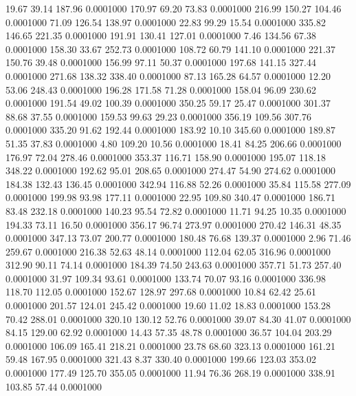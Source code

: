   19.67   39.14  187.96   0.0001000
 170.97   69.20   73.83   0.0001000
 216.99  150.27  104.46   0.0001000
  71.09  126.54  138.97   0.0001000
  22.83   99.29   15.54   0.0001000
 335.82  146.65  221.35   0.0001000
 191.91  130.41  127.01   0.0001000
   7.46  134.56   67.38   0.0001000
 158.30   33.67  252.73   0.0001000
 108.72   60.79  141.10   0.0001000
 221.37  150.76   39.48   0.0001000
 156.99   97.11   50.37   0.0001000
 197.68  141.15  327.44   0.0001000
 271.68  138.32  338.40   0.0001000
  87.13  165.28   64.57   0.0001000
  12.20   53.06  248.43   0.0001000
 196.28  171.58   71.28   0.0001000
 158.04   96.09  230.62   0.0001000
 191.54   49.02  100.39   0.0001000
 350.25   59.17   25.47   0.0001000
 301.37   88.68   37.55   0.0001000
 159.53   99.63   29.23   0.0001000
 356.19  109.56  307.76   0.0001000
 335.20   91.62  192.44   0.0001000
 183.92   10.10  345.60   0.0001000
 189.87   51.35   37.83   0.0001000
   4.80  109.20   10.56   0.0001000
  18.41   84.25  206.66   0.0001000
 176.97   72.04  278.46   0.0001000
 353.37  116.71  158.90   0.0001000
 195.07  118.18  348.22   0.0001000
 192.62   95.01  208.65   0.0001000
 274.47   54.90  274.62   0.0001000
 184.38  132.43  136.45   0.0001000
 342.94  116.88   52.26   0.0001000
  35.84  115.58  277.09   0.0001000
 199.98   93.98  177.11   0.0001000
  22.95  109.80  340.47   0.0001000
 186.71   83.48  232.18   0.0001000
 140.23   95.54   72.82   0.0001000
  11.71   94.25   10.35   0.0001000
 194.33   73.11   16.50   0.0001000
 356.17   96.74  273.97   0.0001000
 270.42  146.31   48.35   0.0001000
 347.13   73.07  200.77   0.0001000
 180.48   76.68  139.37   0.0001000
   2.96   71.46  259.67   0.0001000
 216.38   52.63   48.14   0.0001000
 112.04   62.05  316.96   0.0001000
 312.90   90.11   74.14   0.0001000
 184.39   74.50  243.63   0.0001000
 357.71   51.73  257.40   0.0001000
  31.97  109.34   93.61   0.0001000
 133.74   70.07   93.16   0.0001000
 336.98  118.70  112.05   0.0001000
 152.67  128.97  297.68   0.0001000
  10.84   62.42   25.61   0.0001000
 201.57  124.01  245.42   0.0001000
  19.60   11.02   18.83   0.0001000
 153.28   70.42  288.01   0.0001000
 320.10  130.12   52.76   0.0001000
  39.07   84.30   41.07   0.0001000
  84.15  129.00   62.92   0.0001000
  14.43   57.35   48.78   0.0001000
  36.57  104.04  203.29   0.0001000
 106.09  165.41  218.21   0.0001000
  23.78   68.60  323.13   0.0001000
 161.21   59.48  167.95   0.0001000
 321.43    8.37  330.40   0.0001000
 199.66  123.03  353.02   0.0001000
 177.49  125.70  355.05   0.0001000
  11.94   76.36  268.19   0.0001000
 338.91  103.85   57.44   0.0001000
